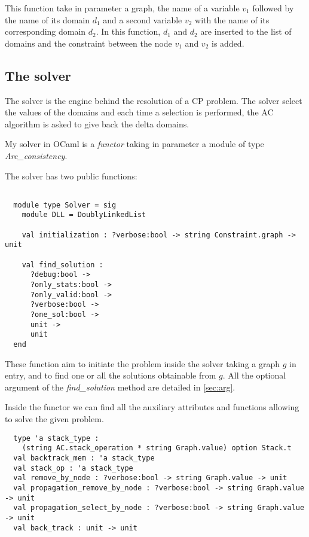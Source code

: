 \documentclass{rapport}
\begin{document}
This function take in parameter a graph, the name of a variable $v_1$ followed by the name of its domain $d_1$ and a second variable $v_2$ with the name of its corresponding domain $d_2$. In this function, $d_1$ and $d_2$ are inserted to the list of domains and the constraint between the node $v_1$ and $v_2$ is added.

\subsection{The solver}

The solver is the engine behind the resolution of a CP problem. The solver select the values of the domains and each time a selection is performed, the AC algorithm is asked to give back the delta domains.

My solver in OCaml is a \textit{functor} taking in parameter a module of type \textit{Arc\_consistency}.

The solver has two public functions:
\begin{verbatim}

  module type Solver = sig
    module DLL = DoublyLinkedList

    val initialization : ?verbose:bool -> string Constraint.graph -> unit

    val find_solution :
      ?debug:bool ->
      ?only_stats:bool ->
      ?only_valid:bool ->
      ?verbose:bool ->
      ?one_sol:bool ->
      unit ->
      unit
  end

\end{verbatim}

These function aim to initiate the problem inside the solver taking a graph $g$ in entry, and to find one or all the solutions obtainable from $g$. All the optional argument of the \textit{find\_solution} method are detailed in \cref{sec:arg}.

Inside the functor we can find all the auxiliary attributes and functions allowing to solve the given problem.

\begin{verbatim}
  type 'a stack_type :
    (string AC.stack_operation * string Graph.value) option Stack.t
  val backtrack_mem : 'a stack_type 
  val stack_op : 'a stack_type
  val remove_by_node : ?verbose:bool -> string Graph.value -> unit
  val propagation_remove_by_node : ?verbose:bool -> string Graph.value -> unit
  val propagation_select_by_node : ?verbose:bool -> string Graph.value -> unit
  val back_track : unit -> unit
\end{verbatim}
\end{document}
